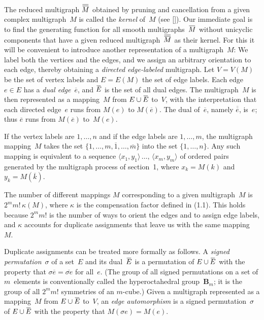 The reduced multigraph $\MM$ obtained by pruning and cancellation from
a given complex multigraph~$M$ is called the {\it kernel\/} of~$M$
(see [\Lii]).
Our immediate goal is to find the generating function for all smooth
multigraphs~$\ovline{M}$ without unicyclic components
that have  a given reduced
multigraph~$\MM$ as their kernel. For this it will be convenient to
introduce another representation of a multigraph~$M$: We label
both the vertices and the edges, and we assign an arbitrary
orientation to each edge,
 thereby obtaining a {\it directed edge-labeled\/}
multigraph. Let $V=V(M)$ be the set of vertex labels and $E=E(M)$ the
set of edge labels. Each edge $e\in E$ has a {\it dual
edge\/}~$\overline{e}$, and
 $\ovline{E}$ is the set of all dual edges. The
multigraph~$M$ is then represented as a mapping~$M$ from 
$E\cup\ovline{E}$
to~$V$, with the interpretation that each directed edge~$e$ runs from
$M(e)$ to $M(\overline{e})$. The dual of~$\overline{e}$, namely 
$\overline{\overline{e}}$,
is~$e$; thus $\overline{e}$ runs from $M(\overline{e})$ to~$M(e)$.

If the vertex labels are $1,\ldots,n$ and if the edge labels are
$1,\ldots,m$, the multigraph mapping~$M$ takes the set
$\{1,\ldots,m,\overline{1},\ldots,\overline{m}\}$ 
into the set $\{1,\ldots,n\}$.
Any such mapping is equivalent to a sequence $\langle
x_1,y_1\rangle\,\ldots,\,\langle x_m,y_m\rangle$ of ordered pairs
generated by the multigraph process of section~1, where $x_k=M(k)$ and
$y_k=M(\overline{k})$. 

The number of different mappings $M$ corresponding to a given 
multigraph~$M$ is $2^mm!\,\kappa(M)$, where $\kappa$ is the
compensation factor defined in
 (1.1).  This holds because $2^mm!$ is the
number of ways to orient the edges and to assign edge labels, 
and $\kappa$ accounts
for duplicate assignments that leave us with the same mapping~$M$. 

Duplicate assignments can be treated
 more formally as follows. A {\it
signed permutation\/}~$\sigma$ of 
a set~$E$ and its dual~$\ovline{E}$ is
a permutation of $E\cup\ovline{E}$ with the property that
$\sigma\overline{e}=\overline{\sigma e}$ for all~$e$. (The group of all
signed permutations on a set of $m$~elements is conventionally called
the hyperoctahedral group~{\bf B}$_m$; it is the group of all $2^mm!$
symmetries of an $m$-cube.) Given a multigraph represented as a
mapping~$M$ from $E\cup\ovline{E}$ to~$V$, an {\it edge
 automorphism\/} is a
signed permutation~$\sigma$ of $E\cup\ovline{E}$
 with the property that $M(\sigma e)=M(e)$.

